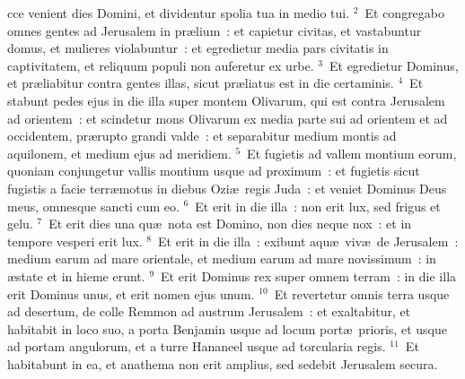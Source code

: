 \bchapter
{}cce venient dies Domini, et dividentur spolia tua in medio tui.
${}^{2}$~Et congregabo omnes gentes ad Jerusalem in pr\ae lium~: et capietur civitas, et vastabuntur domus, et mulieres violabuntur~: et egredietur media pars civitatis in captivitatem, et reliquum populi non auferetur ex urbe.
${}^{3}$~Et egredietur Dominus, et pr\ae liabitur contra gentes illas, sicut pr\ae liatus est in die certaminis.
${}^{4}$~Et stabunt pedes ejus in die illa super montem Olivarum, qui est contra Jerusalem ad orientem~: et scindetur mons Olivarum ex media parte sui ad orientem et ad occidentem, pr\ae rupto grandi valde~: et separabitur medium montis ad aquilonem, et medium ejus ad meridiem.
${}^{5}$~Et fugietis ad vallem montium eorum, quoniam conjungetur vallis montium usque ad proximum~: et fugietis sicut fugistis a facie terr\ae motus in diebus Ozi\ae\ regis Juda~: et veniet Dominus Deus meus, omnesque sancti cum eo.
${}^{6}$~Et erit in die illa~: non erit lux, sed frigus et gelu.
${}^{7}$~Et erit dies una qu\ae\ nota est Domino, non dies neque nox~: et in tempore vesperi erit lux.
${}^{8}$~Et erit in die illa~: exibunt aqu\ae\ viv\ae\ de Jerusalem~: medium earum ad mare orientale, et medium earum ad mare novissimum~: in \ae state et in hieme erunt.
${}^{9}$~Et erit Dominus rex super omnem terram~: in die illa erit Dominus unus, et erit nomen ejus unum.
${}^{10}$~Et revertetur omnis terra usque ad desertum, de colle Remmon ad austrum Jerusalem~: et exaltabitur, et habitabit in loco suo, a porta Benjamin usque ad locum port\ae\ prioris, et usque ad portam angulorum, et a turre Hananeel usque ad torcularia regis.
${}^{11}$~Et habitabunt in ea, et anathema non erit amplius, sed sedebit Jerusalem secura.


